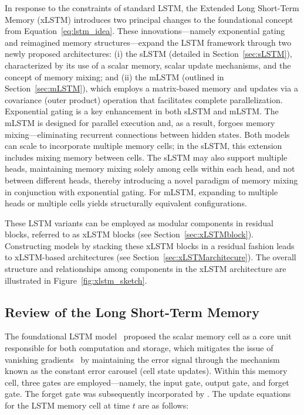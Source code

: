 In response to the constraints of standard LSTM, the Extended Long Short-Term Memory (xLSTM) introduces two principal changes to the foundational concept from Equation~\eqref{eq:lstm_idea}. These innovations—namely exponential gating and reimagined memory structures—expand the LSTM framework through two newly proposed architectures: (i) the sLSTM (detailed in Section~\ref{sec:sLSTM}), characterized by its use of a scalar memory, scalar update mechanisms, and the concept of memory mixing; and (ii) the mLSTM (outlined in Section~\ref{sec:mLSTM}), which employs a matrix-based memory and updates via a covariance (outer product) operation that facilitates complete parallelization. Exponential gating is a key enhancement in both sLSTM and mLSTM. The mLSTM is designed for parallel execution and, as a result, forgoes memory mixing—eliminating recurrent connections between hidden states. Both models can scale to incorporate multiple memory cells; in the sLSTM, this extension includes mixing memory between cells. The sLSTM may also support multiple heads, maintaining memory mixing solely among cells within each head, and not between different heads, thereby introducing a novel paradigm of memory mixing in conjunction with exponential gating. For mLSTM, expanding to multiple heads or multiple cells yields structurally equivalent configurations.

These LSTM variants can be employed as modular components in residual blocks, referred to as xLSTM blocks (see Section~\ref{sec:xLSTMblock}). Constructing models by stacking these xLSTM blocks in a residual fashion leads to xLSTM-based architectures (see Section~\ref{sec:xLSTMarchitecure}). The overall structure and relationships among components in the xLSTM architecture are illustrated in Figure~\ref{fig:xlstm_sketch}.

\subsection{Review of the Long Short-Term Memory}
\label{sec:orgLSTM}

The foundational LSTM model~\citep{Hochreiter:91,Hochreiter:97nips,Hochreiter:97} proposed the scalar memory cell as a core unit responsible for both computation and storage, which mitigates the issue of vanishing gradients~\citep{Hochreiter:91,Hochreiter:00book} by maintaining the error signal through the mechanism known as the constant error carousel (cell state updates). Within this memory cell, three gates are employed—namely, the input gate, output gate, and forget gate. The forget gate was subsequently incorporated by \citet{Gers:00}. The update equations for the LSTM memory cell at time $t$ are as follows:

